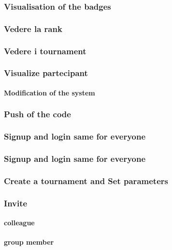 \documentclass{article}
\begin{document}
            \subsubsection{Visualisation of the badges}
            \subsubsection{Vedere la rank}
            \subsubsection{Vedere i tournament}
            \subsubsection{Visualize partecipant}
        
        \paragraph*{Modification of the system}
            \subsubsection{Push of the code}
            \subsubsection{Signup and login same for everyone}
            \subsubsection{Signup and login same for everyone}
            \subsubsection{Create a tournament and Set parameters}
            \subsubsection{Invite}
                \paragraph*{colleague}

                \paragraph*{group member}
\end{document}
